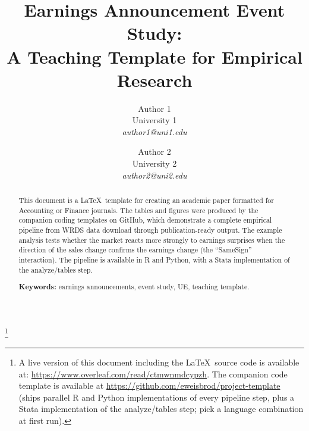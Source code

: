 \documentclass[english,authoryear,IEEEtran,12pt]{article}
\date{}
\newcommand\blfootnote[1]{%
  \begingroup
  \renewcommand\thefootnote{}\footnote{#1}%
  \addtocounter{footnote}{-1}%
  \endgroup
}
\begin{document}
\makeatletter
\patchcmd{\NAT@test}{\else \NAT@nm}{\else \NAT@nmfmt{\NAT@nm}}{}{}
\DeclareRobustCommand\citepos
  {\begingroup
   \let\NAT@nmfmt\NAT@posfmt
   \NAT@swafalse\let\NAT@ctype\z@\NAT@partrue
   \@ifstar{\NAT@fulltrue\NAT@citetp}{\NAT@fullfalse\NAT@citetp}}
\let\NAT@orig@nmfmt\NAT@nmfmt
\def\NAT@posfmt#1{\NAT@orig@nmfmt{#1's}}
\makeatother

\setlength{\abovedisplayskip}{4pt}
\setlength{\belowdisplayskip}{4pt}

\clearpage
\begin{singlespace}
\title{\textbf{\large Earnings Announcement Event Study: \\ A Teaching Template for Empirical Research}}
\vspace{-1ex}
{\author{\normalsize Author 1 \\ University 1 \\ \textit{author1@uni1.edu} \vspace{-2ex} \and \normalsize Author 2  \\ University 2  \\ \textit{author2@uni2.edu}} }
\maketitle
\end{singlespace}
\thispagestyle{empty}

\begin{singlespace}
\vspace{-0.5in}
\begin{abstract}
\noindent This document is a \LaTeX\ template for creating an academic paper formatted for Accounting or Finance journals. The tables and figures were produced by the companion coding templates on GitHub, which demonstrate a complete empirical pipeline from WRDS data download through publication-ready output. The example analysis tests whether the market reacts more strongly to earnings surprises when the direction of the sales change confirms the earnings change (the ``SameSign'' interaction). The pipeline is available in R and Python, with a Stata implementation of the analyze/tables step.

\bigskip

\noindent \textbf{Keywords:} earnings announcements, event study, UE, teaching template.
\end{abstract}
\end{singlespace}

\blfootnote{A live version of this document including the \LaTeX\ source code is available at: \url{https://www.overleaf.com/read/ctmwnmdcypzh}. The companion code template is available at \url{https://github.com/eweisbrod/project-template} (ships parallel R and Python implementations of every pipeline step, plus a Stata implementation of the analyze/tables step; pick a language combination at first run).}
\end{document}
